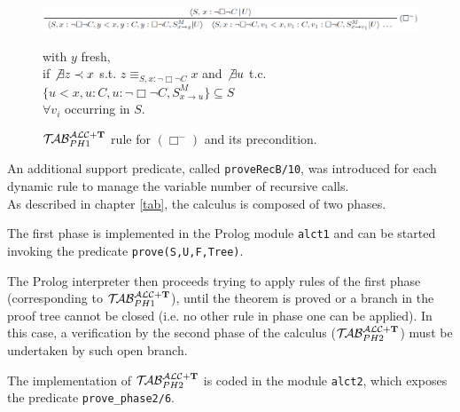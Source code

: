 \documentclass[a4paper, 11pt, oneside]{duthesis}
\newcommand{\tip}{{\bf T}}
\newcommand{\primo}{\mathrel{{\mathcal{T}\!\mathcal{AB}}}_{PH 1}^{\mathcal{ALC}+\mbox{\scriptsize $\tip$}}}
\newcommand{\secondo}{\mathrel{{\mathcal{T}\!\mathcal{AB}}}_{PH 2}^{\mathcal{ALC}+\mbox{\scriptsize $\tip$}}}
\begin{document}
\begin{figure}[htp]
\begin{center}\includegraphics[scale=0.32]{img/box_rule.png}\end{center} %
\begin{flushright} with $y$ fresh,\\
if $\not\exists z \prec x$ s.t. $z \equiv_{S,x:\neg \Box \neg C} x $ and $ \not\exists u$ t.c. $\{u < x, u : C, u : \neg \Box \neg C, S^M_{x\rightarrow u} \} \subseteq S$\\
$\forall v_i$ occurring in $S$.
\normalsize
\end{flushright}
	\caption{$\primo$ rule for $(\Box^-)$ and its precondition.}
	\label{fig_box_rule}
\end{figure}


An additional support predicate, called \texttt{proveRecB/10}, was introduced for each dynamic rule to manage the variable number of recursive calls.\\

As described in chapter \ref{tab}, the calculus is composed of two phases.

The first phase is implemented in the Prolog module \texttt{alct1} and can be started invoking the predicate \texttt{prove(S,U,F,Tree)}.

The Prolog interpreter then proceeds trying to apply rules of the first phase (corresponding to $\primo$), until the theorem is proved or a branch in the proof tree cannot be closed (i.e. no other rule in phase one can be applied). 
In this case, a verification by the second phase of the calculus ($\secondo$) must be undertaken by such open branch.

The implementation of $\secondo$ is coded in the module \texttt{alct2}, which exposes the predicate \texttt{prove\_phase2/6}.
\end{document}
